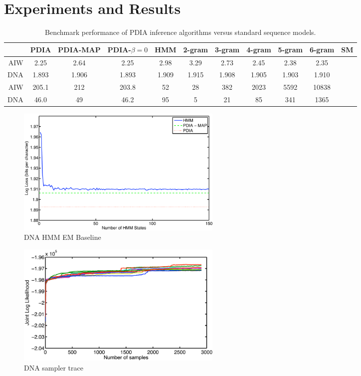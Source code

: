 \section{Experiments and Results}
\label{sec:results}

\begin{table}[t]
    \begin{center}
    \setlength{\tabcolsep}{1.3mm}
\begin{tabular}{r|cccccccccc}
\hline
& {\bf PDIA } & PDIA-MAP & PDIA-$\beta=0$ & HMM & 2-gram& 3-gram & 4-gram & 5-gram & 6-gram & SM \\
\hline
AIW & 2.25 & 2.64 & 2.25 & 2.98 & 3.29 & 2.73 & 2.45 & 2.38 & 2.35 &\\
DNA & 1.893 & 1.906 & 1.893 & 1.909 & 1.915 & 1.908 & 1.905 & 1.903 & 1.910 & \\
\hline
\hline
AIW & 205.1 & 212 & 203.8 & 52 & 28 & 382 & 2023 & 5592 & 10838 &\\
DNA & 46.0 & 49 & 46.2 & 95 & 5 & 21 & 85 & 341 & 1365 & \\
\hline
\end{tabular}
\end{center}
\caption[Short]{Benchmark performance of PDIA inference algorithms versus standard sequence models.}
\label{table:results}
\end{table}

\begin{figure}[htbp]
\begin{center}
\includegraphics[width=10cm]{results/dna_hmm}
\caption{DNA HMM EM Baseline}
\label{fig:dna_hmm}
\end{center}
\end{figure}

\begin{figure}[htbp]
\begin{center}
\includegraphics[width=10cm]{results/dna_sampler}
\caption{DNA sampler trace }
\label{fig:dna_sampler}
\end{center}
\end{figure}

